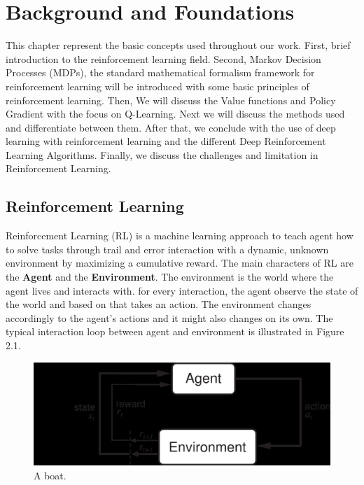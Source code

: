 
\chapter{Background and Foundations}\label{chapter:Background and Foundations}

This chapter represent the basic concepts used throughout our work. First, brief introduction to the reinforcement learning field. Second, Markov Decision Processes (MDPs), the standard mathematical formalism framework for reinforcement learning will be introduced with some basic principles of reinforcement learning. Then, We will discuss the Value functions and Policy Gradient with the focus on Q-Learning. Next we will discuss the methods used and differentiate between them. After that, we conclude with  the use of deep learning with reinforcement learning and the different Deep Reinforcement Learning Algorithms. Finally, we  discuss the challenges and limitation in Reinforcement Learning.

\section{Reinforcement Learning}
Reinforcement Learning (RL) is a machine learning approach to teach agent how to solve tasks through trail and error interaction with a dynamic, unknown environment by maximizing a cumulative reward. The main characters of RL are the \textbf{Agent} and the \textbf{Environment}. The environment is the world where the agent lives and interacts with. for every interaction, the agent observe the state of the world and based on that takes an action. The environment changes accordingly to the agent's actions and it might also changes on its own. The typical interaction loop between agent and environment is illustrated in Figure 2.1.
\begin{figure}
  \includegraphics[width=\linewidth]{figures/Agent-Env.jpg}
  \caption{A boat.}
  \label{fig:boat1}
\end{figure}

